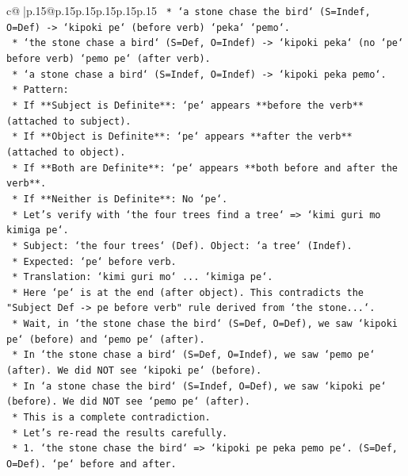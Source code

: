 \documentclass{article}
\begin{document}
{\begin{supertabular}{c@{$\;$}|p{.15\linewidth}@{}p{.15\linewidth}p{.15\linewidth}p{.15\linewidth}p{.15\linewidth}p{.15\linewidth}}
{{{\texttt{                *   `a stone chase the bird` (S=Indef, O=Def) {-}> `kipoki pe` (before verb) `peka` `pemo`.} \\
\texttt{                *   `the stone chase a bird` (S=Def, O=Indef) {-}> `kipoki peka` (no `pe` before verb) `pemo pe` (after verb).} \\
\texttt{                *   `a stone chase a bird` (S=Indef, O=Indef) {-}> `kipoki peka pemo`.} \\
\texttt{            *   Pattern:} \\
\texttt{                *   If **Subject is Definite**: `pe` appears **before the verb** (attached to subject).} \\
\texttt{                *   If **Object is Definite**: `pe` appears **after the verb** (attached to object).} \\
\texttt{                *   If **Both are Definite**: `pe` appears **both before and after the verb**.} \\
\texttt{                *   If **Neither is Definite**: No `pe`.} \\
\texttt{            *   Let's verify with `the four trees find a tree` => `kimi guri mo kimiga pe`.} \\
\texttt{                *   Subject: `the four trees` (Def). Object: `a tree` (Indef).} \\
\texttt{                *   Expected: `pe` before verb.} \\
\texttt{                *   Translation: `kimi guri mo` ... `kimiga pe`.} \\
\texttt{                *   Here `pe` is at the end (after object). This contradicts the "Subject Def {-}> pe before verb" rule derived from `the stone...`.} \\
\texttt{                *   Wait, in `the stone chase the bird` (S=Def, O=Def), we saw `kipoki pe` (before) and `pemo pe` (after).} \\
\texttt{                *   In `the stone chase a bird` (S=Def, O=Indef), we saw `pemo pe` (after). We did NOT see `kipoki pe` (before).} \\
\texttt{                *   In `a stone chase the bird` (S=Indef, O=Def), we saw `kipoki pe` (before). We did NOT see `pemo pe` (after).} \\
\texttt{                *   This is a complete contradiction.} \\
\texttt{                *   Let's re{-}read the results carefully.} \\
\texttt{                *   1. `the stone chase the bird` => `kipoki pe peka pemo pe`. (S=Def, O=Def). `pe` before and after.} \\
}}}
\end{supertabular}}
\end{document}
